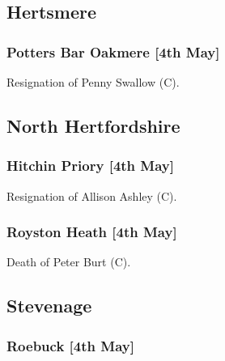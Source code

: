 \documentclass[a4paper,openany]{book}
\begin{document}
\begin{resultsiii}
\subsection*{Hertsmere}

\subsubsection*{Potters Bar Oakmere \hspace*{\fill}\nolinebreak[1]%
\enspace\hspace*{\fill}
[4th May]}


Resignation of Penny Swallow (C).

\subsection*{North Hertfordshire}

\subsubsection*{Hitchin Priory \hspace*{\fill}\nolinebreak[1]%
\enspace\hspace*{\fill}
[4th May]}


Resignation of Allison Ashley (C).

\subsubsection*{Royston Heath \hspace*{\fill}\nolinebreak[1]%
\enspace\hspace*{\fill}
[4th May]}


Death of Peter Burt (C).

\subsection*{Stevenage}

\subsubsection*{Roebuck \hspace*{\fill}\nolinebreak[1]%
\enspace\hspace*{\fill}
[4th May]}


\end{resultsiii}
\end{document}
